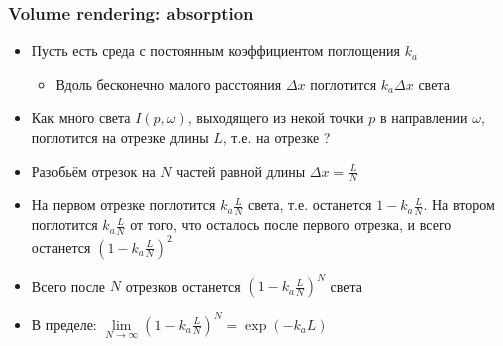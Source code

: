 \documentclass{beamer}
\begin{document}
\begin{frame}[fragile]
\frametitle{Volume rendering: absorption}
\begin{itemize}
\item Пусть есть среда с постоянным коэффициентом поглощения \begin{math}k_a\end{math}
\pause
\begin{itemize}
\item Вдоль бесконечно малого расстояния \begin{math}\Delta x\end{math} поглотится \begin{math}k_a \Delta x\end{math} света
\end{itemize}
\pause
\item Как много света \begin{math}I(p,\omega)\end{math}, выходящего из некой точки \begin{math}p\end{math} в направлении \begin{math}\omega\end{math}, поглотится на отрезке длины \begin{math}L\end{math}, т.е. на отрезке \begin{math}[p, p + L\omega]\end{math}?
\pause
\item Разобьём отрезок на \begin{math}N\end{math} частей равной длины \begin{math}\Delta x = \frac{L}{N}\end{math}
\pause
\item На первом отрезке поглотится \begin{math}k_a \frac{L}{N}\end{math} света, т.е. останется \begin{math}1 - k_a\frac{L}{N}\end{math}. На втором поглотится \begin{math}k_a \frac{L}{N}\end{math} от того, что осталось после первого отрезка, и всего останется \begin{math}\left(1 - k_a\frac{L}{N}\right)^2\end{math}
\pause
\item Всего после \begin{math}N\end{math} отрезков останется \begin{math}\left(1 - k_a\frac{L}{N}\right)^N\end{math} света
\pause
\item В пределе: \begin{math}\lim\limits_{N \rightarrow \infty} \left(1 - k_a\frac{L}{N}\right)^N = \exp(- k_a L)\end{math}
\end{itemize}
\end{frame}
\end{document}
